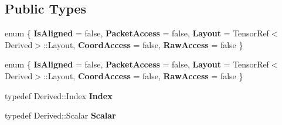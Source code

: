 \subsection*{Public Types}
\begin{DoxyCompactItemize}
\item 
\mbox{\label{struct_eigen_1_1_tensor_evaluator_3_01const_01_tensor_ref_3_01_derived_01_4_00_01_device_01_4_a3286d8b8088e88cba209f66618bc9970}} 
enum \{ \newline
{\bfseries Is\+Aligned} = false, 
{\bfseries Packet\+Access} = false, 
{\bfseries Layout} = Tensor\+Ref$<$Derived$>$\+:\+:Layout, 
{\bfseries Coord\+Access} = false, 
\newline
{\bfseries Raw\+Access} = false
 \}
\item 
\mbox{\label{struct_eigen_1_1_tensor_evaluator_3_01const_01_tensor_ref_3_01_derived_01_4_00_01_device_01_4_ab1a1526201e815b2d958e4f3cef0bf26}} 
enum \{ \newline
{\bfseries Is\+Aligned} = false, 
{\bfseries Packet\+Access} = false, 
{\bfseries Layout} = Tensor\+Ref$<$Derived$>$\+:\+:Layout, 
{\bfseries Coord\+Access} = false, 
\newline
{\bfseries Raw\+Access} = false
 \}
\item 
\mbox{\label{struct_eigen_1_1_tensor_evaluator_3_01const_01_tensor_ref_3_01_derived_01_4_00_01_device_01_4_a0e6bc98067e911e670554cdd6e31a4a6}} 
typedef Derived\+::\+Index {\bfseries Index}
\item 
\mbox{\label{struct_eigen_1_1_tensor_evaluator_3_01const_01_tensor_ref_3_01_derived_01_4_00_01_device_01_4_a7501b639f2fb1a6f3ed79dad6db243ab}} 
typedef Derived\+::\+Scalar {\bfseries Scalar}
\item 
\mbox{\label{struct_eigen_1_1_tensor_evaluator_3_01const_01_tensor_ref_3_01_derived_01_4_00_01_device_01_4_aafcdefdaf0a7e3da98365da1d1d36081}} 

\end{DoxyCompactItemize}
